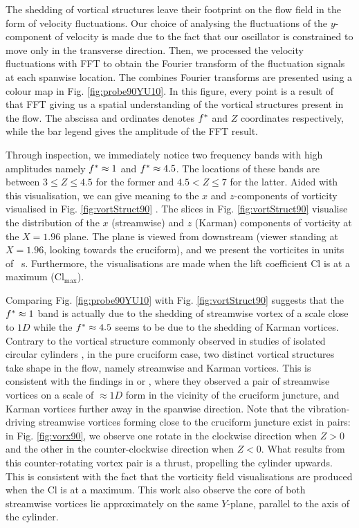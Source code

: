 \documentclass[oneside]{utmthesis}
\begin{document}
The shedding of vortical structures leave their footprint on the flow field in the form of velocity fluctuations. Our choice of analysing the fluctuations of the $y$-component of velocity is made due to the fact that our oscillator is constrained to move only in the transverse direction. Then, we processed the velocity fluctuations with FFT to obtain the Fourier transform of the fluctuation signals at each spanwise location. The combines Fourier transforms are presented using a colour map in Fig. \ref{fig:probe90YU10}. In this figure, every point is a result of that FFT giving us a spatial understanding of the vortical structures present in the flow. The abscissa and ordinates denotes $f^{*}$ and $Z$ coordinates respectively, while the bar legend gives the amplitude of the FFT result.

Through inspection, we immediately notice two frequency bands with high amplitudes namely $f^{*} \approx 1$ and $f^{*} \approx 4.5$. The locations of these bands are between $3 \leq Z \leq 4.5$ for the former and $4.5 < Z \leq 7$ for the latter. Aided with this visualisation, we can give meaning to the $x$ and $z$-components of vorticity visualised in Fig. \ref{fig:vortStruct90} . The slices in Fig. \ref{fig:vortStruct90} visualise the distribution of the $x$ (streamwise) and $z$ (Karman) components of vorticity at the $X = 1.96$ plane. The plane is viewed from downstream (viewer standing at $X = 1.96$, looking towards the cruciform), and we present the vorticites in units of \si{\per\second}. Furthermore, the visualisations are made when the lift coefficient Cl is at a maximum ($\text{Cl}_{\text{max}}$).

Comparing Fig. \ref{fig:probe90YU10} with Fig. \ref{fig:vortStruct90} suggests that the $f^{*} \approx 1$ band is actually due to the shedding of streamwise vortex of a scale close to $1D$ while the $f^{*} \approx 4.5$ seems to be due to the shedding of Karman vortices. Contrary to the vortical structure commonly observed in studies of isolated circular cylinders \citep{Deng2007,Kinaci2016,Duranay2020}, in the pure cruciform case, two distinct vortical structures take shape in the flow, namely streamwise and Karman vortices. This is consistent with the findings in \citet{Koide2017} or \citet{Zhao2018a}, where they observed a pair of streamwise vortices on a scale of $\approx 1D$ form in the vicinity of the cruciform juncture, and Karman vortices further away in the spanwise direction. Note that the vibration-driving streamwise vortices forming close to the cruciform juncture exist in pairs: in Fig. \ref{fig:vorx90}, we observe one rotate in the clockwise direction when $Z > 0$ and the other in the counter-clockwise direction when $Z < 0$. What results from this counter-rotating vortex pair is a thrust, propelling the cylinder upwards. This is consistent with the fact that the vorticity field visualisations are produced when the Cl is at a maximum. This work also observe the core of both streamwise vortices lie approximately on the same $Y$-plane, parallel to the axis of the cylinder.
\end{document}
